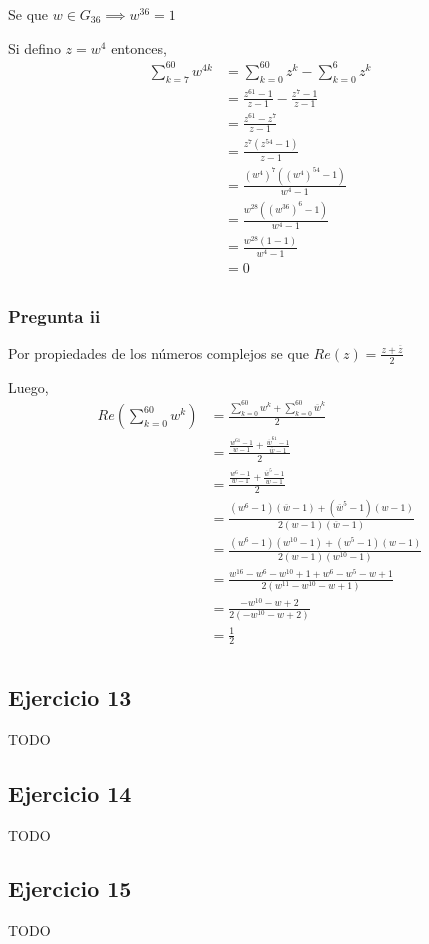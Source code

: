 Se que $ w \in G_{36} \implies w^{36} = 1 $

Si defino $ z = w^4 $ entonces,
\begin{align*}
    \sum_{k = 7}^{60}w^{4k} &= \sum_{k = 0}^{60}z^k - \sum_{k = 0}^{6}z^k \\
    &= \frac{z^{61} - 1}{z-1} - \frac{z^7-1}{z-1} \\
    &= \frac{z^{61} - z^7}{z-1} \\
    &= \frac{z^7(z^{54} - 1)}{z-1} \\
    &= \frac{(w^4)^7((w^4)^{54} - 1)}{w^4-1} \\
    &= \frac{w^{28}((w^{36})^6 - 1)}{w^4-1} \\
    &= \frac{w^{28}(1 - 1)}{w^4-1} \\
    &= 0 \\
\end{align*}

\subsubsection{Pregunta ii}

Por propiedades de los números complejos se que $ Re(z) = \frac{z+\overline{z}}{2} $

Luego,
\begin{align*}
    Re(\sum_{k = 0}^{60}w^k) &= \frac{\sum_{k = 0}^{60}w^k + \sum_{k = 0}^{60}\overline{w}^k}{2} \\
    &= \frac{\frac{w^{61} - 1}{w-1} + \frac{\overline{w}^{61} - 1}{\overline{w}-1}}{2} \\
    &= \frac{\frac{w^{6} - 1}{w-1} + \frac{\overline{w}^{5} - 1}{\overline{w}-1}}{2} \\
    &= \frac{(w^{6} - 1)(\overline{w}-1) + (\overline{w}^{5} - 1)(w-1)}{2(w-1)(\overline{w}-1)} \\
    &= \frac{(w^6-1)(w^{10}-1) + (w^5-1)(w-1)}{2(w-1)(w^{10}-1)} \\
    &= \frac{w^{16} - w^6 - w^{10} + 1 + w^6 - w^5 - w + 1}{2(w^{11} - w^{10} - w + 1)} \\
    &= \frac{- w^{10}- w + 2}{2(- w^{10} - w + 2)} \\
    &= \frac{1}{2} \\
\end{align*}

\subsection{Ejercicio 13}
TODO

\subsection{Ejercicio 14}
TODO

\subsection{Ejercicio 15}
TODO


